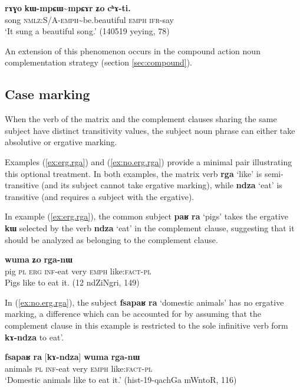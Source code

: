 \documentclass[oneside,a4paper,11pt]{article}
\newcommand{\ipa}[1]{\textbf{\phon#1}} %
\newcommand{\jpg}[2]{\ipa{#1} `#2'} %
\newcommand{\tld}{\textasciitilde{}}
\begin{document}
\begin{exe}
\ex \label{ex:rAGo.chAti}
\gll 
\ipa{rɤɣo} 	\ipa{kɯ-mpɕɯ\tld{}mpɕɤr} 	\ipa{ʑo} 	\ipa{cʰɤ-ti.} \\
song \textsc{nmlz:S/A-emph}\tld{}be.beautiful \textsc{emph} \textsc{ifr}-say \\
\glt `It sung a beautiful song.' (140519 yeying, 78)
\end{exe}

An extension of this phenomenon occurs in the compound action noun complementation strategy (section \ref{sec:compound}).

\subsection{Case marking}
When the verb of the matrix and the complement clauses sharing the same subject have distinct transitivity values, the subject noun phrase can either take absolutive or ergative marking. 

Examples (\ref{ex:erg.rga}) and (\ref{ex:no.erg.rga}) provide a minimal pair illustrating this optional treatment. In both examples, the matrix verb \jpg{rga}{like} is semi-transitive (and its subject cannot take ergative marking), while \jpg{ndza}{eat} is transitive (and requires a subject with the ergative).

In example (\ref{ex:erg.rga}), the common subject \ipa{paʁ} \ipa{ra}  `pigs' takes the ergative \ipa{kɯ} selected by the verb  \jpg{ndza}{eat} in the complement clause, suggesting that it should be analyzed as belonging to the complement clause.

\begin{exe}
\ex \label{ex:erg.rga}
\gll
[\ipa{paʁ}  	\ipa{ra}  	\ipa{kɯ}  	\ipa{kɤ-ndza}]  	\ipa{wuma}  	\ipa{ʑo}  	\ipa{rga-nɯ}  \\
pig \textsc{pl} \textsc{erg} \textsc{inf}-eat very \textsc{emph}  like:\textsc{fact}-\textsc{pl} \\
 \glt Pigs like to eat it. (12 ndZiNgri, 149)
\end{exe}

In (\ref{ex:no.erg.rga}), the subject \ipa{fsapaʁ} 	\ipa{ra} `domestic animals' has no ergative marking, a difference which can be accounted for by assuming that the  complement clause in this example is restricted to the sole infinitive verb form \ipa{kɤ-ndza}   to eat'.

\begin{exe}
\ex \label{ex:no.erg.rga}
\gll \ipa{fsapaʁ} 	\ipa{ra} 	[\ipa{kɤ-ndza}] 	\ipa{wuma} 	\ipa{rga-nɯ}  \\
animals \textsc{pl}  \textsc{inf}-eat very \textsc{emph}  like:\textsc{fact}-\textsc{pl} \\
\glt `Domestic animals like to eat it.' (hist-19-qachGa mWntoR, 116)
\end{exe}
 
\end{document}
